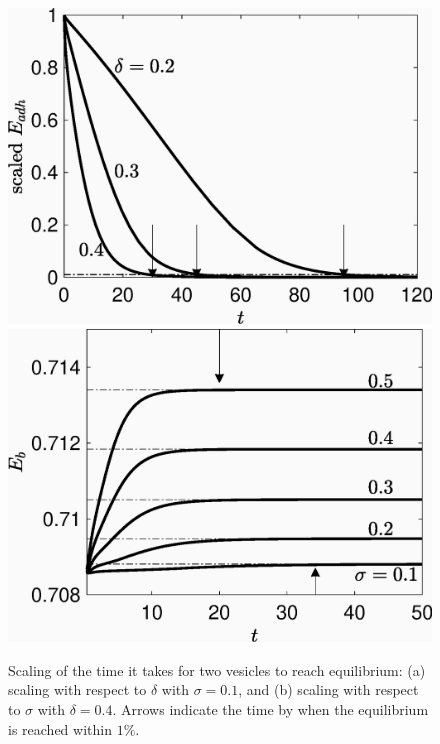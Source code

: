 \documentclass[%
preprint,
 amsmath,amssymb,
 aps,
]{revtex4-1}
\begin{document}
\begin{figure}
\includegraphics[keepaspectratio=true,scale=0.4]{figs/Dec13a_time_scaling01.eps}
\includegraphics[keepaspectratio=true,scale=0.4]{figs/Dec13a_time_scaling02.eps}
\caption{Scaling of the time it takes for two vesicles to reach equilibrium: (a) scaling with respect to $\delta$ with $\sigma=0.1$, and (b) scaling
with respect to $\sigma$ with $\delta = 0.4$. Arrows indicate the time by when the equilibrium is reached within $1\%$.}
\label{fig:qflow00}
\end{figure}
\end{document}
